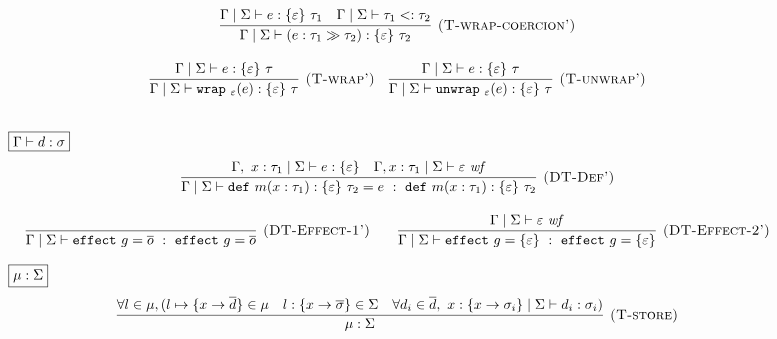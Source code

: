 \documentclass{article}
\theoremstyle{definition}
\newcommand{\keywadj}[1]{\mathtt{#1}}
\newcommand{\keyw}[1]{\keywadj{#1}~}
\begin{document}
\begin{figure}[H]
{\[\begin{array}{c}
    \infer[\textsc{(T-wrap-coercion')}]
  {\Gamma \mid \Sigma \vdash (e : \tau_1 \gg \tau_2) :  \{\varepsilon\} \ \tau_2}
  {\Gamma \mid \Sigma \vdash e :  \{\varepsilon\}\ \tau_1 & \Gamma \mid \Sigma \vdash \tau_1 <: \tau_2} \\[3ex]
  
  
  
      \infer[\textsc{(T-wrap')}]
  {\Gamma \mid \Sigma \vdash \keyw{wrap}_\varepsilon(e) : \{\varepsilon\}\ \tau}
  {\Gamma \mid \Sigma \vdash e : \{\varepsilon\}\  \tau} \quad 
  
      \infer[\textsc{(T-unwrap')}]
  {\Gamma \mid \Sigma \vdash \keyw{unwrap}_\varepsilon(e) :   \{\varepsilon\}\ \tau}
  {\Gamma \mid \Sigma \vdash e : \{\varepsilon\}\ \tau} \\[3ex]
\end{array} \\[3ex]
\]
}

\noindent$\fbox{$\Gamma \vdash d : \sigma$}$
\[
\begin{array}{c}
\infer[\textsc{(DT-Def')}]
  {\Gamma \mid \Sigma \vdash \keyw{def} m(x : \tau_1) : \{ \varepsilon \}~\tau_2 = e~:~\keyw{def} m(x : \tau_1) : \{ \varepsilon \}~\tau_2}
  { \Gamma,~x : \tau_1 \mid \Sigma \vdash e : \{ \varepsilon \} & \Gamma, x : \tau_1 \mid \Sigma \vdash \varepsilon~ \mathit{wf}  }\\[3ex]

\infer[\textsc{(DT-Effect-1')}]
  {\Gamma \mid \Sigma \vdash \keyw{effect} g = \overline{o} ~:~\keyw{effect} g =  \overline{o} }
  {} \quad \quad 
  
  
\infer[\textsc{(DT-Effect-2')}]
  {\Gamma\mid \Sigma \vdash \keyw{effect} g = \{ \varepsilon \}~:~\keyw{effect} g = \{ \varepsilon \}}
  {\Gamma\mid \Sigma \vdash \varepsilon~\mathit{wf}}
 
\end{array}\\[3ex]
\]



\noindent$\fbox{$\mu : \Sigma $}$
\[
\begin{array}{c}
      \infer[\textsc{(T-store)}]
  {\mu : \Sigma}
  {\forall l \in \mu, ( l \mapsto \{x \rightarrow \overline{d}\} \in \mu & l:\{x\rightarrow \overline{\sigma}\} \in \Sigma & \forall d_i\in \overline{d},\ x:\{x \rightarrow \sigma_i\} \mid \Sigma \vdash d_i : \sigma_i	)} 
\end{array} \\[3ex]
\]


\end{figure}
\end{document}
